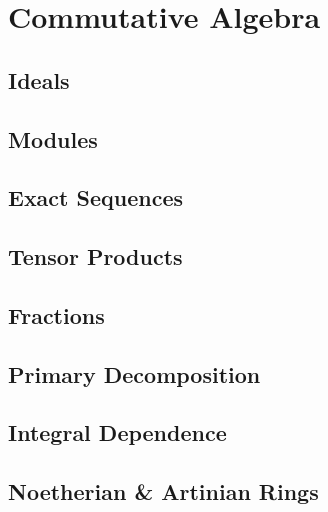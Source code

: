 \chapter{Commutative Algebra}

\section{Ideals}

\section{Modules}

\section{Exact Sequences}

\section{Tensor Products}

\section{Fractions}

\section{Primary Decomposition}

\section{Integral Dependence}

\section{Noetherian \& Artinian Rings}
